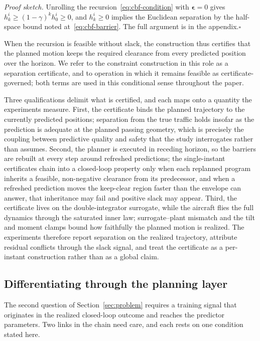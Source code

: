 \documentclass[11pt]{article}
\theoremstyle{plain}
\theoremstyle{definition}
\begin{document}
\noindent\emph{Proof sketch.}
Unrolling the recursion~\eqref{eq:cbf-condition} with
$\bm{\epsilon} = 0$ gives $h^i_k \geq (1-\gamma)^k h^i_0 \geq 0$, and
$h^i_k \geq 0$ implies the Euclidean separation by the half-space
bound noted at~\eqref{eq:cbf-barrier}. The full argument is in the
appendix.\hfill$\square$
 
When the recursion is feasible without slack, the construction thus
certifies that the planned motion keeps the required clearance from
every predicted position over the horizon. We refer to the constraint
construction in this role as a separation certificate, and to
operation in which it remains feasible as certificate-governed; both
terms are used in this conditional sense throughout the paper.
 
Three qualifications delimit what is certified, and each maps onto a
quantity the experiments measure. First, the certificate binds the
planned trajectory to the currently predicted positions; separation
from the true traffic holds insofar as the prediction is adequate at
the planned passing geometry, which is precisely the coupling between
predictive quality and safety that the study interrogates rather than
assumes. Second, the planner is executed in receding horizon, so the
barriers are rebuilt at every step around refreshed predictions; the
single-instant certificates chain into a closed-loop property only
when each replanned program inherits a feasible, non-negative
clearance from its predecessor, and when a refreshed prediction moves
the keep-clear region faster than the envelope can answer, that
inheritance may fail and positive slack may appear. Third, the certificate
lives on the double-integrator surrogate, while the aircraft flies the
full dynamics through the saturated inner law; surrogate--plant
mismatch and the tilt and moment clamps bound how faithfully the
planned motion is realized. The experiments therefore report
separation on the realized trajectory, attribute residual conflicts
through the slack signal, and treat the certificate as a per-instant
construction rather than as a global claim.
 
\subsection{Differentiating through the planning layer}
\label{sec:method-diff}
 
The second question of Section~\ref{sec:problem} requires a training
signal that originates in the realized closed-loop outcome and reaches
the predictor parameters. Two links in the chain need care, and each
rests on one condition stated here.
 
\end{document}
